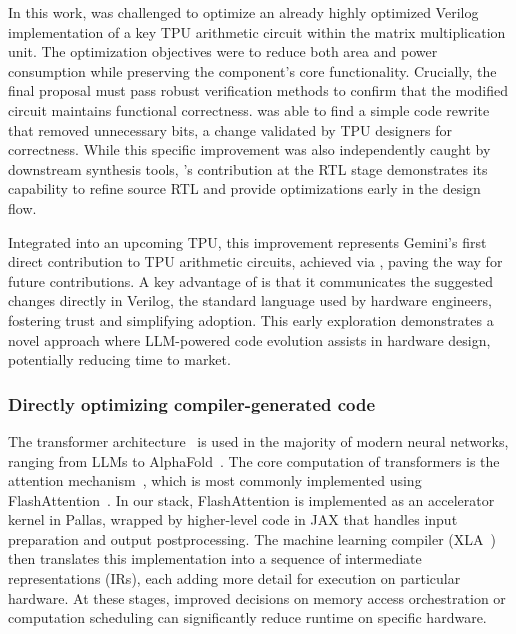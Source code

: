 In this work, \method was challenged to optimize an already highly optimized Verilog implementation of a key TPU arithmetic circuit within the matrix multiplication unit. The optimization objectives were to reduce both area and power consumption while preserving the component's core functionality. Crucially, the final proposal must pass robust verification methods to confirm that the modified circuit maintains functional correctness. \method was able to find a simple code rewrite that removed unnecessary bits, a change validated by TPU designers for correctness. While this specific improvement was also independently caught by downstream synthesis tools, \method's contribution at the RTL stage demonstrates its capability to refine source RTL and provide optimizations early in the design flow.

Integrated into an upcoming TPU, this improvement represents Gemini’s first direct contribution to TPU arithmetic circuits, achieved via \method, paving the way for future contributions. A key advantage of \method is that it communicates the suggested changes directly in Verilog, the standard language used by hardware engineers, fostering trust and simplifying adoption. This early exploration demonstrates a novel approach where LLM-powered code evolution assists in hardware design, potentially reducing time to market.


\subsubsection{Directly optimizing compiler-generated code}

The transformer architecture~\cite{vaswani2017attention} is used in the majority of modern neural networks, ranging from LLMs to AlphaFold~\cite{alphafold3}. 
The core computation of transformers is the attention mechanism~\cite{bahdanau2014neural}, which is most commonly implemented using FlashAttention~\cite{dao2022flashattention}.
In our stack, FlashAttention is implemented as an accelerator kernel in Pallas, wrapped by higher-level code in JAX that handles input preparation and output postprocessing.
The machine learning compiler (XLA~\cite{xla}) then translates this implementation into a sequence of intermediate representations (IRs), each adding more detail for execution on particular hardware. At these stages, improved decisions on memory access orchestration or computation scheduling can significantly reduce runtime on specific hardware.

